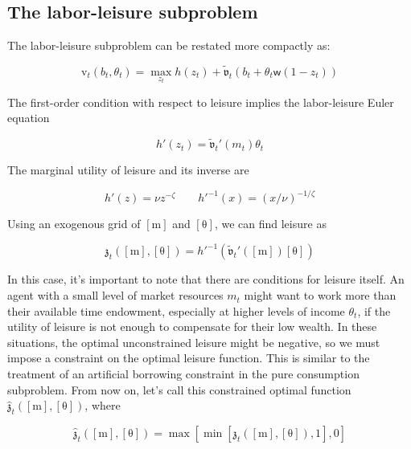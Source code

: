\documentclass{article}
\newcommand{\tShkEmp}{\theta}
\newcommand{\labShare}{\nu}
\newcommand{\leiShare}{\zeta}
\newcommand{\h}{h}
\newcommand{\bRat}{b}
\newcommand{\leisure}{z}
\newcommand{\vFunc}{\mathrm{v}}
\newcommand{\wage}{\mathsf{w}}
\newcommand{\mRat}{m}
\newcommand{\vOpt}{\tilde{\mathfrak{v}}}
\newcommand{\xRat}{x}
\newcommand{\mMat}{[\mathrm{m}]}
\newcommand{\tShkMat}{[\mathrm{\tShkEmp}]}
\newcommand{\zEndFunc}{\mathfrak{z}}
\begin{document}
\subsection{The labor-leisure subproblem}\label{The labor-leisure subproblem}

The labor-leisure subproblem can  be restated more compactly as:

\begin{equation}
\vFunc_{t}(\bRat_{t}, \tShkEmp_{t}) = \max_{ \leisure_{t}}
  \h(\leisure_{t}) + \vOpt_{t}(\bRat_{t} +
  \tShkEmp_{t} \wage (1-\leisure_{t}))
\end{equation}

The first-order condition with respect to leisure implies the labor-leisure Euler equation

\begin{equation}
\h'(\leisure_{t}) = \vOpt_{t}'(\mRat_{t}) \tShkEmp_{t}
\end{equation}

The marginal utility of leisure and its inverse are

\begin{equation}
\h'(\leisure) = \labShare\leisure^{-\leiShare} \qquad
  \h'^{-1}(\xRat) = (\xRat/\labShare)^{-1/\leiShare}
\end{equation}

Using an exogenous grid of $\mMat$ and $\tShkMat$, we can find leisure as

\begin{equation}
\zEndFunc_{t}(\mMat, \tShkMat) = \h'^{-1}\left(
  \vOpt_{t}'(\mMat) \tShkMat \right)
\end{equation}

In this case, it's important to note that there are conditions for leisure itself. An agent with a small level of market resources $\mRat_{t}$ might want to work more than their available time endowment, especially at higher levels of income $\tShkEmp_{t}$, if the utility of leisure is not enough to compensate for their low wealth. In these situations, the optimal unconstrained leisure might be negative, so we must impose a constraint on the optimal leisure function. This is similar to the treatment of an artificial borrowing constraint in the pure consumption subproblem. From now on, let's call this constrained optimal function $\hat{\zEndFunc}_{t}(\mMat, \tShkMat)$, where

\begin{equation}
\hat{\zEndFunc}_{t}(\mMat, \tShkMat) = \max \left[ \min \left[ \zEndFunc_{t}(\mMat, \tShkMat), 1 \right], 0 \right]
\end{equation}
\end{document}
